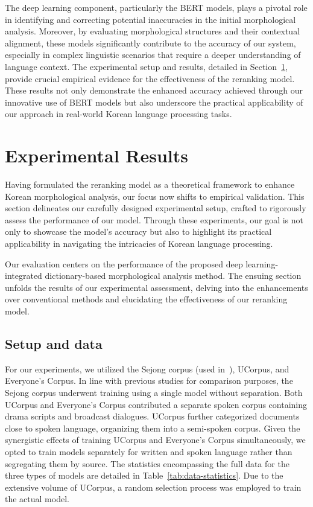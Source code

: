 \documentclass[AMS,STIX2COL]{WileyNJD-v2}
\begin{document}
    The deep learning component, particularly the BERT models, plays a pivotal role in identifying and correcting potential inaccuracies in the initial morphological analysis.
    Moreover, by evaluating morphological structures and their contextual alignment, these models significantly contribute to the accuracy of our system, especially in complex linguistic scenarios that require a deeper understanding of language context.
    The experimental setup and results, detailed in Section~\ref{sec:results}, provide crucial empirical evidence for the effectiveness of the reranking model.
    These results not only demonstrate the enhanced accuracy achieved through our innovative use of BERT models but also underscore the practical applicability of our approach in real-world Korean language processing tasks.


    \section{Experimental Results}\label{sec:results}

    Having formulated the reranking model as a theoretical framework to enhance Korean morphological analysis, our focus now shifts to empirical validation.
    This section delineates our carefully designed experimental setup, crafted to rigorously assess the performance of our model.
    Through these experiments, our goal is not only to showcase the model's accuracy but also to highlight its practical applicability in navigating the intricacies of Korean language processing.

    Our evaluation centers on the performance of the proposed deep learning-integrated dictionary-based morphological analysis method.
    The ensuing section unfolds the results of our experimental assessment, delving into the enhancements over conventional methods and elucidating the effectiveness of our reranking model.

    \subsection{Setup and data}\label{subsec:setup-and-data}

    For our experiments, we utilized the Sejong corpus (used in~\cite{MinJW2019, MinJW2020, MinJW2022, MinJW2018, NaSH2015, NaSH2014, NaSH2018, SongHJ2019, SongHJ2020}), UCorpus\cite{UCorpusHG}, and Everyone's Corpus\cite{EveryoneCorpus}.
    In line with previous studies for comparison purposes, the Sejong corpus underwent training using a single model without separation.
    Both UCorpus and Everyone's Corpus contributed a separate spoken corpus containing drama scripts and broadcast dialogues.
    UCorpus further categorized documents close to spoken language, organizing them into a semi-spoken corpus.
    Given the synergistic effects of training UCorpus and Everyone's Corpus simultaneously, we opted to train models separately for written and spoken language rather than segregating them by source.
    The statistics encompassing the full data for the three types of models are detailed in Table~\ref{tab:data-statistics}.
    Due to the extensive volume of UCorpus, a random selection process was employed to train the actual model.
\end{document}
